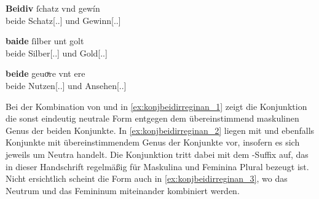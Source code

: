 \begin{exe}
\ex \label{ex:konjbeidirreginan}
	\begin{xlist}
	\ex \gll \textbf{Beidiv} ſchatz vnd gewín \\
			beide Schatz[\Acc.\Sg.\MascI] und Gewinn[\Acc.\Sg.\MascI] \\
		\begin{taggedline}{\parencites[\pno~29\vb, 41]{kc:VB}[vgl.][6112]{schroeder1895}}
		\trans {}
		\end{taggedline}
		\label{ex:konjbeidirreginan_1}

	\ex \gll \textbf{baide} ſilber unt golt \\
			beide Silber[\Acc.\Sg.\NeutI] und Gold[\Acc.\Sg.\NeutI] \\
		\begin{taggedline}{\parencites[\pno~68\rb, 43]{kc:A1}[vgl.][16012]{schroeder1895}}
		\trans {}
		\end{taggedline}
		\label{ex:konjbeidirreginan_2}

	\ex \gll \textbf{beide} geuoͮre vnt ere \\
			beide Nutzen[\Acc.\Sg.\NeutI] und Ansehen[\Acc.\Sg.\FemI] \\
		\begin{taggedline}{\parencites[\pno~4\ra, 16--17]{kc:A1}[vgl.][772]{schroeder1895}}
		\trans {}
		\end{taggedline}
		\label{ex:konjbeidirreginan_3}
	\end{xlist}
\end{exe}

Bei der Kombination von   und 
 in \cref{ex:konjbeidirreginan_1} zeigt die Konjunktion die sonst
eindeutig neutrale Form entgegen dem übereinstimmend maskulinen Genus der
beiden Konjunkte. In \cref{ex:konjbeidirreginan_2} liegen mit 
 und   ebenfalls Konjunkte mit
übereinstimmendem Genus der Konjunkte vor, insofern es sich jeweils um Neutra
handelt. Die Konjunktion tritt dabei mit dem -Suffix auf, das in dieser
Handschrift regelmäßig für Maskulina und Feminina Plural bezeugt ist. Nicht
ersichtlich scheint die Form  auch in \cref{ex:konjbeidirreginan_3},
wo das Neutrum   und das Femininum 
 miteinander kombiniert werden.

